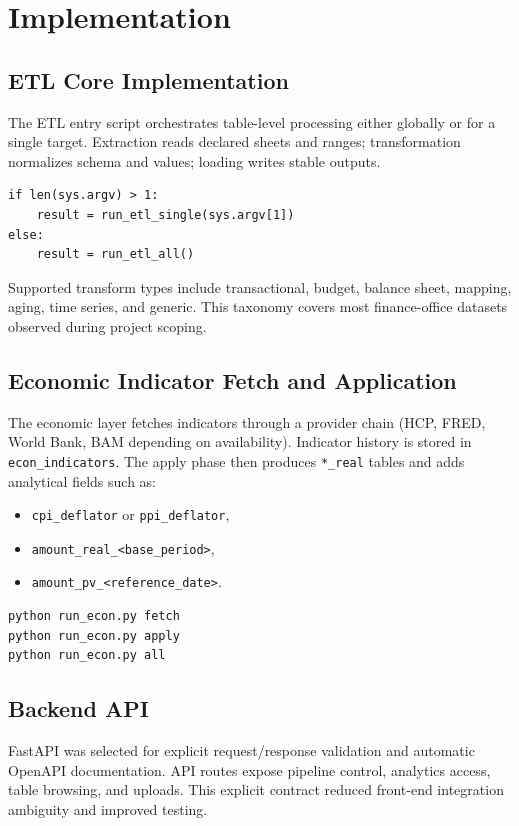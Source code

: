 \documentclass[12pt,a4paper]{report}
\begin{document}
\chapter{Implementation}
\section{ETL Core Implementation}
The ETL entry script orchestrates table-level processing either globally or for a single target. Extraction reads declared sheets and ranges; transformation normalizes schema and values; loading writes stable outputs.

\begin{lstlisting}[style=py, caption={Simplified ETL launcher behavior.}]
if len(sys.argv) > 1:
    result = run_etl_single(sys.argv[1])
else:
    result = run_etl_all()
\end{lstlisting}

Supported transform types include transactional, budget, balance sheet, mapping, aging, time series, and generic. This taxonomy covers most finance-office datasets observed during project scoping.

\section{Economic Indicator Fetch and Application}
The economic layer fetches indicators through a provider chain (HCP, FRED, World Bank, BAM depending on availability). Indicator history is stored in \texttt{econ\_indicators}. The apply phase then produces \texttt{*\_real} tables and adds analytical fields such as:
\begin{itemize}[leftmargin=1.5em]
  \item \texttt{cpi\_deflator} or \texttt{ppi\_deflator},
  \item \texttt{amount\_real\_<base\_period>},
  \item \texttt{amount\_pv\_<reference\_date>}.
\end{itemize}

\begin{lstlisting}[style=py, caption={Economic workflow command pattern.}]
python run_econ.py fetch
python run_econ.py apply
python run_econ.py all
\end{lstlisting}

\section{Backend API}
FastAPI was selected for explicit request/response validation and automatic OpenAPI documentation. API routes expose pipeline control, analytics access, table browsing, and uploads. This explicit contract reduced front-end integration ambiguity and improved testing.
\end{document}
